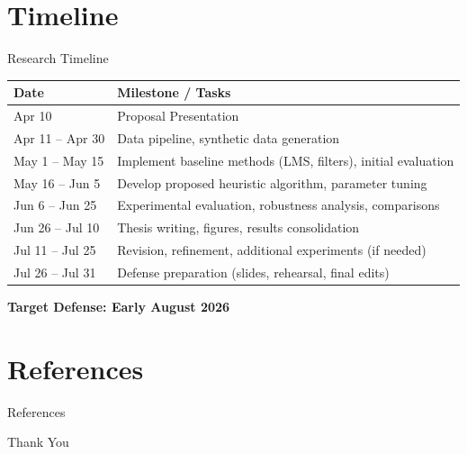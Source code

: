 \documentclass{beamer}
\begin{document}
\section{Timeline}
\begin{frame}{Research Timeline}
\small
\begin{tabular}{p{2.5cm} p{8cm}}
\hline
\textbf{Date} & \textbf{Milestone / Tasks} \\
\hline
Apr 10 & Proposal Presentation \\

Apr 11 -- Apr 30 & Data pipeline, synthetic data generation \\

May 1 -- May 15 & Implement baseline methods (LMS, filters), initial evaluation \\

May 16 -- Jun 5 & Develop proposed heuristic algorithm, parameter tuning \\

Jun 6 -- Jun 25 & Experimental evaluation, robustness analysis, comparisons \\

Jun 26 -- Jul 10 & Thesis writing, figures, results consolidation \\

Jul 11 -- Jul 25 & Revision, refinement, additional experiments (if needed) \\

Jul 26 -- Jul 31 & Defense preparation (slides, rehearsal, final edits) \\
\hline
\end{tabular}

\vspace{0.5cm}
\centering
\textbf{Target Defense: Early August 2026}
\end{frame}
\section{References}

\begin{frame}[allowframebreaks]{References}
    
    
\end{frame}

\begin{frame}
    \centering
    \Huge Thank You
\end{frame}
\end{document}
